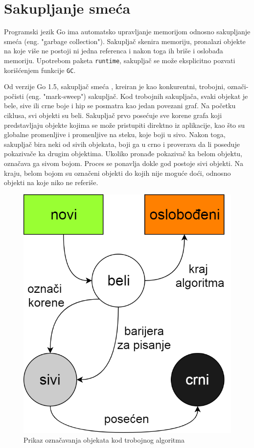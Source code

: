 \documentclass[12pt,oneside]{memoir}
\begin{document}
\section{Sakupljanje smeća}

Programski jezik Go ima automatsko upravljanje memorijom odnosno sakupljanje smeća (eng. "garbage collection"). Sakupljač skenira memoriju, pronalazi objekte na koje više ne postoji ni jedna referenca i nakon toga ih briše i oslobađa memoriju. Upotrebom paketa \texttt{runtime}, sakupljač se može eksplicitno pozvati korišćenjem funkcije \texttt{GC}. 

Od verzije Go 1.5, sakupljač smeća \cite{garbage}, kreiran je kao konkurentni, trobojni, označi-počisti (eng. "mark-sweep") sakupljač. Kod trobojnih sakupljača, svaki objekat je bele, sive ili crne boje i hip se posmatra kao jedan povezani graf. Na početku ciklusa, svi objekti su beli. Sakupljač prvo posećuje sve korene grafa koji predstavljaju objekte kojima se može pristupiti direktno iz aplikacije, kao što su globalne promenljive i promenljive na steku, koje boji u sivo. Nakon toga, sakupljač bira neki od sivih objekata, boji ga u crno i proverava da li poseduje pokazivače ka drugim objektima. Ukoliko pronađe pokazivač ka belom objektu, označava ga sivom bojom. Proces se ponavlja dokle god postoje sivi objekti. Na kraju, belom bojom su označeni objekti do kojih nije moguće doći, odnosno objekti na koje niko ne referiše.

\begin{figure}
\begin{center}
\includegraphics[scale=0.33]{tricolor.png}
\end{center}
\caption{Prikaz označavanja objekata kod trobojnog algoritma}
\label{fig:tricolor}
\end{figure}
\end{document}
